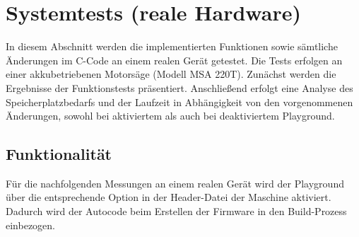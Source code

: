 \section{Systemtests (reale Hardware)}
In diesem Abschnitt werden die implementierten Funktionen sowie sämtliche Änderungen im C-Code an einem realen Gerät getestet. Die Tests erfolgen an einer akkubetriebenen Motorsäge (Modell MSA 220T). Zunächst werden die Ergebnisse der Funktionstests präsentiert. Anschließend erfolgt eine Analyse des Speicherplatzbedarfs und der Laufzeit in Abhängigkeit von den vorgenommenen Änderungen, sowohl bei aktiviertem als auch bei deaktiviertem Playground.

\subsection{Funktionalität}
Für die nachfolgenden Messungen an einem realen Gerät wird der Playground über die entsprechende Option in der Header-Datei der Maschine aktiviert. Dadurch wird der Autocode beim Erstellen der Firmware in den Build-Prozess einbezogen.
